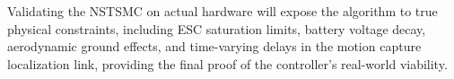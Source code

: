 Validating the NSTSMC on actual hardware will expose the algorithm to true physical constraints, including ESC saturation limits, battery voltage decay, aerodynamic ground effects, and time-varying delays in the motion capture localization link, providing the final proof of the controller's real-world viability.

